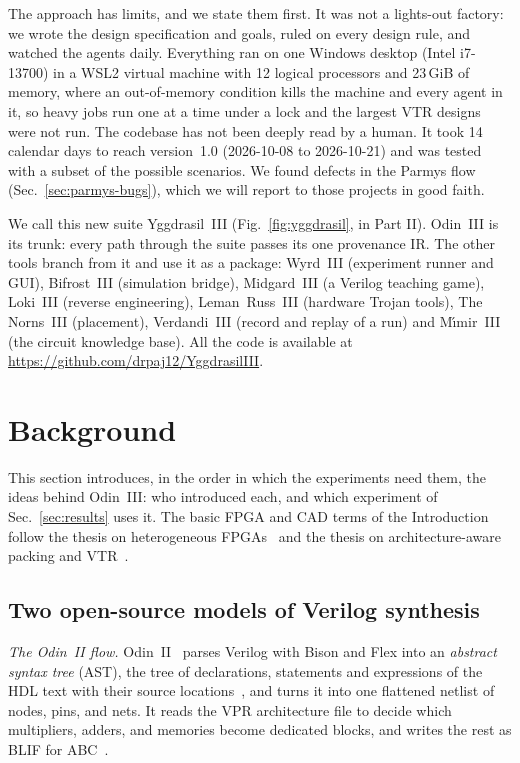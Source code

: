 \documentclass[conference]{IEEEtran}
\begin{document}
The approach has limits, and we state them first. It was not a lights-out factory: we wrote the design specification and goals, ruled on every design rule, and watched the agents daily. Everything ran on one Windows desktop (Intel i7-13700) in a WSL2 virtual machine with 12 logical processors and 23\,GiB of memory, where an out-of-memory condition kills the machine and every agent in it, so heavy jobs run one at a time under a lock and the largest VTR designs were not run. The codebase has not been deeply read by a human. It took 14 calendar days to reach version~1.0 (2026-10-08 to 2026-10-21) and was tested with a subset of the possible scenarios. We found defects in the Parmys flow (Sec.~\ref{sec:parmys-bugs}), which we will report to those projects in good faith.

We call this new suite Yggdrasil~III (Fig.~\ref{fig:yggdrasil}, in Part II). Odin~III is its trunk: every path through the suite passes its one provenance IR. The other tools branch from it and use it as a package: Wyrd~III (experiment runner and GUI), Bifrost~III (simulation bridge), Midgard~III (a Verilog teaching game), Loki~III (reverse engineering), Leman~Russ~III (hardware Trojan tools), The Norns~III (placement), Verdandi~III (record and replay of a run) and M\'{\i}mir~III (the circuit knowledge base). All the code is available at \url{https://github.com/drpaj12/YggdrasilIII}.


\section{Background}
\label{sec:background}

This section introduces, in the order in which the experiments need them, the ideas behind Odin~III: who introduced each, and which experiment of Sec.~\ref{sec:results} uses it. The basic FPGA and CAD terms of the Introduction follow the thesis on heterogeneous FPGAs~\cite{jamiesonthesis} and the thesis on architecture-aware packing and VTR~\cite{luuthesis}.

\subsection{Two open-source models of Verilog synthesis}

\emph{The Odin~II flow.} Odin~II~\cite{jamieson2011odin2} parses Verilog with Bison and Flex into an \emph{abstract syntax tree} (AST), the tree of declarations, statements and expressions of the HDL text with their source locations~\cite{ast}, %
and turns it into one flattened netlist of nodes, pins, and nets. It reads the VPR architecture file to decide which multipliers, adders, and memories become dedicated blocks, and writes the rest as BLIF for ABC~\cite{brayton2010abc}.
\end{document}
